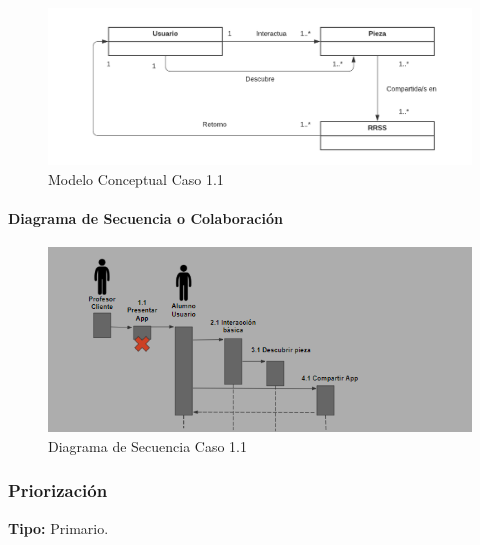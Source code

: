 \begin{figure}[H]
\centerline{\includegraphics[width=15cm]{imgs/ModeloConceptualCaso_1_3.png}}
\caption{Modelo Conceptual Caso 1.1}
\label{fig_1_2}
\end{figure}

\paragraph{Diagrama de Secuencia o Colaboración}

\begin{figure}[H]
\centerline{\includegraphics[width=15cm]{imgs/CasoUso_1_2.PNG}}
\caption{Diagrama de Secuencia Caso 1.1}
\label{fig_1_3}
\end{figure}

\subsubsection{Priorización}
{\textbf {Tipo:}}
Primario.